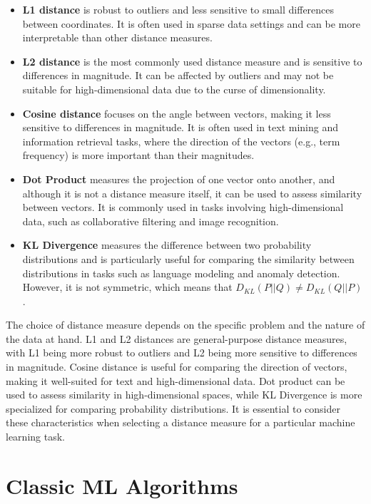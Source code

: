 \documentclass[12pt]{article}
\begin{document}
\begin{itemize}
\item \textbf{L1 distance} is robust to outliers and less sensitive to small differences between coordinates. It is often used in sparse data settings and can be more interpretable than other distance measures.
\item \textbf{L2 distance} is the most commonly used distance measure and is sensitive to differences in magnitude. It can be affected by outliers and may not be suitable for high-dimensional data due to the curse of dimensionality.
\item \textbf{Cosine distance} focuses on the angle between vectors, making it less sensitive to differences in magnitude. It is often used in text mining and information retrieval tasks, where the direction of the vectors (e.g., term frequency) is more important than their magnitudes.

\item \textbf{Dot Product} measures the projection of one vector onto another, and although it is not a distance measure itself, it can be used to assess similarity between vectors. It is commonly used in tasks involving high-dimensional data, such as collaborative filtering and image recognition.

\item \textbf{KL Divergence} measures the difference between two probability distributions and is particularly useful for comparing the similarity between distributions in tasks such as language modeling and anomaly detection. However, it is not symmetric, which means that $D_{KL}(P || Q) \neq D_{KL}(Q || P)$.
\end{itemize}

The choice of distance measure depends on the specific problem and the nature of the data at hand. L1 and L2 distances are general-purpose distance measures, with L1 being more robust to outliers and L2 being more sensitive to differences in magnitude. Cosine distance is useful for comparing the direction of vectors, making it well-suited for text and high-dimensional data. Dot product can be used to assess similarity in high-dimensional spaces, while KL Divergence is more specialized for comparing probability distributions. It is essential to consider these characteristics when selecting a distance measure for a particular machine learning task.

\section{Classic ML Algorithms}
\end{document}
